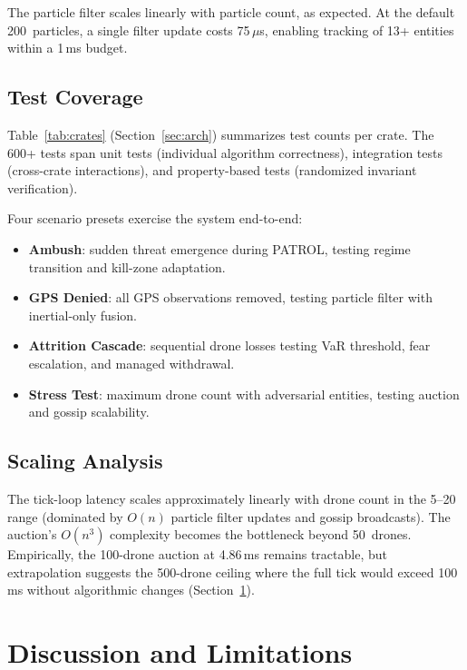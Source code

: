 \documentclass[conference]{IEEEtran}
\begin{document}
The particle filter scales linearly with particle count, as expected.
At the default 200~particles, a single filter update costs 75\,$\mu$s,
enabling tracking of 13{+} entities within a 1\,ms budget.

\subsection{Test Coverage}

Table~\ref{tab:crates} (Section~\ref{sec:arch}) summarizes test
counts per crate.  The 600{+} tests span unit tests (individual
algorithm correctness), integration tests (cross-crate interactions),
and property-based tests (randomized invariant verification).

Four scenario presets exercise the system end-to-end:
\begin{itemize}
\setlength{\itemsep}{0pt}
  \item \textbf{Ambush}: sudden threat emergence during PATROL,
    testing regime transition and kill-zone adaptation.
  \item \textbf{GPS Denied}: all GPS observations removed, testing
    particle filter with inertial-only fusion.
  \item \textbf{Attrition Cascade}: sequential drone losses testing
    VaR threshold, fear escalation, and managed withdrawal.
  \item \textbf{Stress Test}: maximum drone count with adversarial
    entities, testing auction and gossip scalability.
\end{itemize}

\subsection{Scaling Analysis}

The tick-loop latency scales approximately linearly with drone count
in the 5--20 range (dominated by $O(n)$ particle filter updates and
gossip broadcasts).  The auction's $O(n^3)$ complexity becomes the
bottleneck beyond 50~drones.  Empirically, the 100-drone auction at
4.86\,ms remains tractable, but extrapolation suggests the 500-drone
ceiling where the full tick would exceed 100\,ms without algorithmic
changes (Section~\ref{sec:discussion}).


\section{Discussion and Limitations}
\label{sec:discussion}
\end{document}
